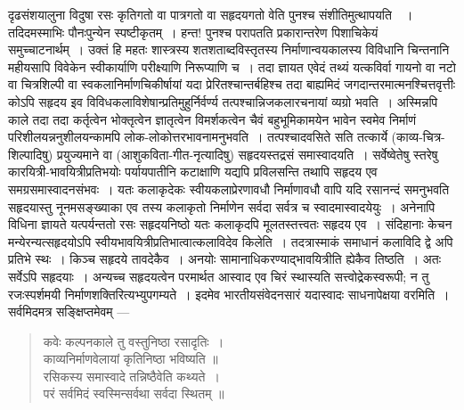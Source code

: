 {\dev दृढसंशयालुना विदुषा रसः कृतिगतो वा पात्रगतो वा सहृदयगतो वेति पुनश्च संशीतिमुत्थाप\-यति}~{\dev~। तदिदमस्माभिः पौनःपुन्येन स्पष्टीकृतम्~। हन्त! पुनश्च परापतति प्रकारान्तरेण पिशाचिकेयं समुच्चाटनार्थम्~। उक्तं हि महतः शास्त्रस्य शतशताब्दविस्तृतस्य निर्माणान्वय\-कालस्य विविधानि चिन्तनानि महीयसापि विवेकेन स्वीकार्याणि परीक्ष्याणि निरू\-प्याणि च~। तदा ज्ञायत एवेदं तथ्यं यत्कविर्वा गायनो वा नटो वा चित्रशिल्पी वा स्वकलानिर्माण\-चिकीर्षायां यदा प्रेरितश्चान्तर्बहिश्च तदा बाह्यमिदं जगदान्तरमात्मनश्चित्तवृत्तीः कोऽपि सहृदय इव विविधकलाविशेषान्प्रतिमुहुर्निर्वर्ण्य तत्पश्चान्निजकलारचनायां व्यग्रो भवति~। अस्मिन्नपि काले तदा तदा कर्तृत्वेन भोक्तृत्वेन ज्ञातृत्वेन विमर्शकत्वेन चैवं बहुभूमिकामयेन भावेन स्वमेव निर्माणं परिशीलयन्ननुशीलयन्कामपि लोक-लोकोत्तरभावनामनुभवति~। तत्पश्चादवसिते सति तत्कार्ये (काव्य-चित्र-शिल्पादिषु) प्रयुज्यमाने वा (आशुकविता-गीत-नृत्यादिषु) सहृदयस्तद्रसं समास्वादयति~। सर्वेष्वेतेषु स्तरेषु कारयित्री-भावयित्रीप्रतिभयोः पर्यायपातीनि कटाक्षाणि यद्यपि प्रविलसन्ति तथापि सहृदय एव समग्रसमास्वादनसंभवः~। यतः कलाकृदेकः स्वीय\-कलाप्रेरणावधौ निर्माणावधौ वापि यदि रसानन्दं समनुभवति सहृदयास्तु नूनमसङ्ख्याका एव तस्य कलाकृतो निर्माणेन सर्वदा सर्वत्र च स्वादमास्वादयेयुः~। अनेनापि विधिना ज्ञायते यत्पर्यन्ततो रसः सहृदयनिष्ठो यतः कलाकृदपि मूलतस्तत्त्वतः सहृदय एव~। संदिहानाः केचन मन्येरन्यत्सहृदयोऽपि स्वीयभावयित्रीप्रतिभात्वात्कलाविदेव किलेति~। तदत्रास्माकं समाधानं कलाविदि द्वे अपि प्रतिभे स्थः~। किञ्च सहृदये तावदेकैव~। अनयोः सामानाधिकरण्याद्भावयि\-त्रीति ह्येकैव तिष्ठति~। अतः सर्वेऽपि सहृदयाः~। अन्यच्च सहृदयत्वेन परमार्थत आस्वाद एव चिरं स्थास्यति सत्त्वोद्रेकस्वरूपी; न तु रजःस्पर्शमयी निर्माणशक्तिरित्यभ्युपगम्यते~। इदमेव भारतीयसंवेदनसारं यदास्वादः साधनापेक्षया वरमिति~। सर्वमिदमत्र सङ्क्षिप्तमेवम् --- }\begin{quote}
{\dev कवेः कल्पनकाले तु वस्तुनिष्ठा रसादृतिः~।}\\
{\dev काव्यनिर्माणवेलायां कृतिनिष्ठा भविष्यति ॥}\\[5pt]
{\dev रसिकस्य समास्वादे तन्निष्ठैवेति कथ्यते~।}\\
{\dev परं सर्वमिदं स्वस्मिन्सर्वथा सर्वदा स्थितम् ॥}
\end{quote}
\vskip -8pt

